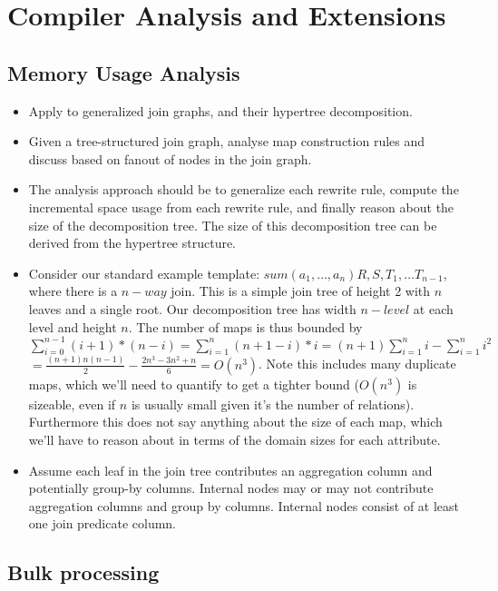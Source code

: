 \section{Compiler Analysis and Extensions}

\subsection{Memory Usage Analysis}
\begin{itemize}
  \item Apply to generalized join graphs, and their hypertree decomposition.
  \item Given a tree-structured join graph, analyse map construction rules and
  discuss based on fanout of nodes in the join graph.
  \item The analysis approach should be to generalize each rewrite rule, compute
  the incremental space usage from each rewrite rule, and finally reason about
  the size of the decomposition tree. The size of this decomposition tree can
  be derived from the hypertree structure.
  \item Consider our standard example template:\linebreak
  $sum(a_1, \ldots , a_n) R,S,T_1,\ldots T_{n-1}$, where there is a $n-way$ join.
  This is a simple join tree of height 2 with $n$ leaves and a single root. Our
  decomposition tree has width $n - level$ at each level and height $n$. The
  number of maps is thus bounded by $\sum_{i=0}^{n-1}{(i+1)*(n-i)} =
  \sum_{i=1}^{n}{(n+1-i)*i} = (n+1)\sum_{i=1}^{n}{i} - \sum_{i=1}^{n}{i^2}$
  \linebreak $= \frac{(n+1)n(n-1)}{2} - \frac{2n^3-3n^2+n}{6} = O(n^3)$.
  Note this includes many duplicate maps, which we'll need to quantify to get a
  tighter bound ($O(n^3)$ is sizeable, even if $n$ is usually small given it's
  the number of relations). Furthermore this does not say anything about the size
  of each map, which we'll have to reason about in terms of the domain sizes for
  each attribute.
  
  \item Assume each leaf in the join tree contributes an aggregation column and
  potentially group-by columns. Internal nodes may or may not contribute
  aggregation columns and group by columns. Internal nodes consist of at least
  one join predicate column.
\end{itemize}

\subsection{Bulk processing}

